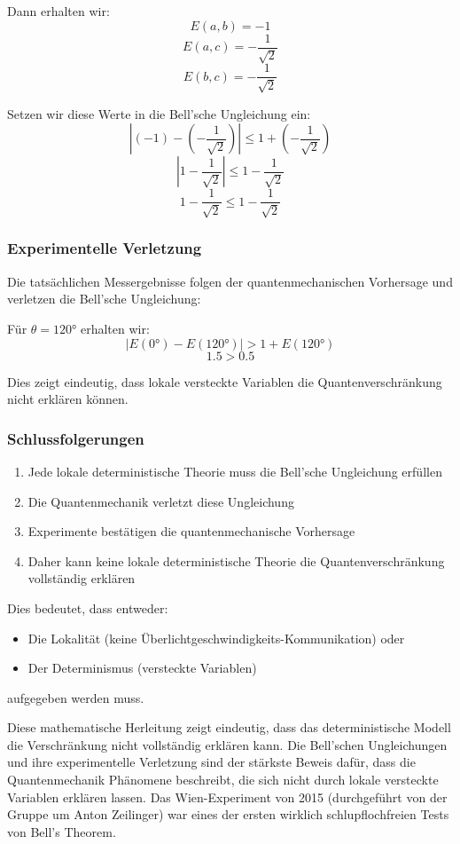 \documentclass[12pt,a4paper]{article}
\begin{document}
	Dann erhalten wir:
	\[
	E(a,b) = -1
	\]
	\[
	E(a,c) = -\frac{1}{\sqrt{2}}
	\]
	\[
	E(b,c) = -\frac{1}{\sqrt{2}}
	\]
	
	Setzen wir diese Werte in die Bell'sche Ungleichung ein:
	\[
	|(-1) - (-\frac{1}{\sqrt{2}})| \leq 1 + (-\frac{1}{\sqrt{2}})
	\]
	\[
	|1 - \frac{1}{\sqrt{2}}| \leq 1 - \frac{1}{\sqrt{2}}
	\]
	\[
	1 - \frac{1}{\sqrt{2}} \leq 1 - \frac{1}{\sqrt{2}}
	\]
	
	\subsubsection{Experimentelle Verletzung}
	Die tatsächlichen Messergebnisse folgen der quantenmechanischen Vorhersage und verletzen die Bell'sche Ungleichung:
	
	Für \(\theta = 120°\) erhalten wir:
	\[
	|E(0°) - E(120°)| > 1 + E(120°)
	\]
	\[
	1.5 > 0.5
	\]
	
	Dies zeigt eindeutig, dass lokale versteckte Variablen die Quantenverschränkung nicht erklären können.
	
	\subsubsection{Schlussfolgerungen}
	\begin{enumerate}
		\item Jede lokale deterministische Theorie muss die Bell'sche Ungleichung erfüllen
		\item Die Quantenmechanik verletzt diese Ungleichung
		\item Experimente bestätigen die quantenmechanische Vorhersage
		\item Daher kann keine lokale deterministische Theorie die Quantenverschränkung vollständig erklären
	\end{enumerate}
	
	Dies bedeutet, dass entweder:
	\begin{itemize}
		\item Die Lokalität (keine Überlichtgeschwindigkeits-Kommunikation) oder
		\item Der Determinismus (versteckte Variablen)
	\end{itemize}
	aufgegeben werden muss.
	
	Diese mathematische Herleitung zeigt eindeutig, dass das deterministische Modell die Verschränkung nicht vollständig erklären kann. Die Bell'schen Ungleichungen und ihre experimentelle Verletzung sind der stärkste Beweis dafür, dass die Quantenmechanik Phänomene beschreibt, die sich nicht durch lokale versteckte Variablen erklären lassen. Das Wien-Experiment von 2015 (durchgeführt von der Gruppe um Anton Zeilinger) war eines der ersten wirklich schlupflochfreien Tests von Bell's Theorem.
	
\end{document}
